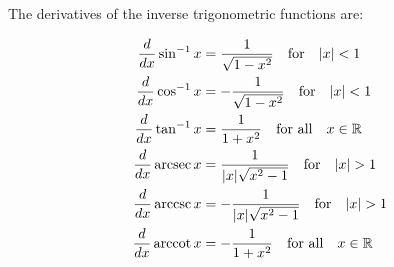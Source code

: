 \documentclass[12pt]{article}
\newcommand{\arcsin}{\sin^{-1}}
\newcommand{\arccos}{\cos^{-1}}
\newcommand{\arctan}{\tan^{-1}}
\begin{document}
The derivatives of the inverse trigonometric functions are:

\begin{align}
    \frac{d}{dx}\arcsin x &= \frac{1}{\sqrt{1-x^2}} \quad \text{for} \quad |x| < 1 \\
    \frac{d}{dx}\arccos x &= -\frac{1}{\sqrt{1-x^2}} \quad \text{for} \quad |x| < 1 \\
    \frac{d}{dx}\arctan x &= \frac{1}{1+x^2} \quad \text{for all} \quad x \in \mathbb{R} \\
    \frac{d}{dx}\arcsec x &= \frac{1}{|x|\sqrt{x^2-1}} \quad \text{for} \quad |x| > 1 \\
    \frac{d}{dx}\arccsc x &= -\frac{1}{|x|\sqrt{x^2-1}} \quad \text{for} \quad |x| > 1 \\
    \frac{d}{dx}\arccot x &= -\frac{1}{1+x^2} \quad \text{for all} \quad x \in \mathbb{R}
\end{align}
\end{document}
